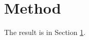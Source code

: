 \documentclass{DemoThesis}
\begin{document}
\section{Method}\label{sec:method}
The result is in Section \ref{sec:method}.
\end{document}
